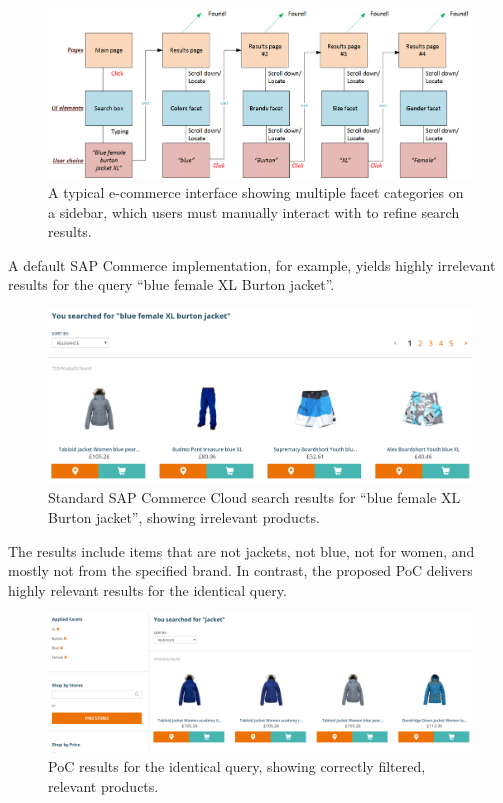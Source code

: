 \documentclass{article}
\begin{document}
    \begin{figure}[H]
        \centering
        \includegraphics[width=\columnwidth]{searchimproved10.png}
        \caption{A typical e-commerce interface showing multiple facet categories on a sidebar, which users must manually interact with to refine search results.}
        \label{fig:facet_ui}
    \end{figure}

    A default SAP Commerce implementation, for example, yields highly irrelevant results for the query “blue female XL Burton jacket”.

    \begin{figure}[H]
        \centering
        \includegraphics[width=\columnwidth]{2017-06-25_21h36_23-1.png}
        \caption{Standard SAP Commerce Cloud search results for “blue female XL Burton jacket”, showing irrelevant products.}
        \label{fig:default_apparel}
    \end{figure}

    The results include items that are not jackets, not blue, not for women, and mostly not from the specified brand. In contrast, the proposed PoC delivers highly relevant results for the identical query.

    \begin{figure}[H]
        \centering
        \includegraphics[width=\columnwidth]{2017-06-25_21h39_15-1.png}
        \caption{PoC results for the identical query, showing correctly filtered, relevant products.}
        \label{fig:poc_apparel}
    \end{figure}
\end{document}
